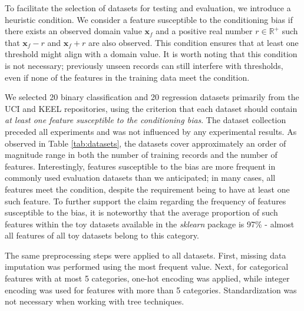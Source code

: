 \documentclass[sn-mathphys]{sn-jnl}%
\theoremstyle{thmstyleone}%
\theoremstyle{thmstyletwo}%
\theoremstyle{thmstylethree}%
\begin{document}
To facilitate the selection of datasets for testing and evaluation, we introduce a heuristic condition. We consider a feature susceptible to the conditioning bias if there exists an observed domain value $\mathbf{x}_f$ and a positive real number $r\in\mathbb{R}^+$ such that $\mathbf{x}_f-r$ and $\mathbf{x}_f+r$ are also observed. This condition ensures that at least one threshold might align with a domain value. It is worth noting that this condition is not necessary; previously unseen records can still interfere with thresholds, even if none of the features in the training data meet the condition.

We selected 20 binary classification and 20 regression datasets primarily from the UCI \citep{uci} and KEEL \citep{keel} repositories, using the criterion that each dataset should contain \emph{at least one feature susceptible to the conditioning bias}. The dataset collection preceded all experiments and was not influenced by any experimental results. As observed in Table \ref{tab:datasets}, the datasets cover approximately an order of magnitude range in both the number of training records and the number of features. Interestingly, features susceptible to the bias are more frequent in commonly used evaluation datasets than we anticipated; in many cases, all features meet the condition, despite the requirement being to have at least one such feature. To further support the claim regarding the frequency of features susceptible to the bias, it is noteworthy that the average proportion of such features within the toy datasets available in the \emph{sklearn} \citep{sklearn} package is 97\% - almost all features of all toy datasets belong to this category.

The same preprocessing steps were applied to all datasets. First, missing data imputation was performed using the most frequent value. Next, for categorical features with at most 5 categories, one-hot encoding was applied, while integer encoding was used for features with more than 5 categories. Standardization was not necessary when working with tree techniques.
\end{document}
